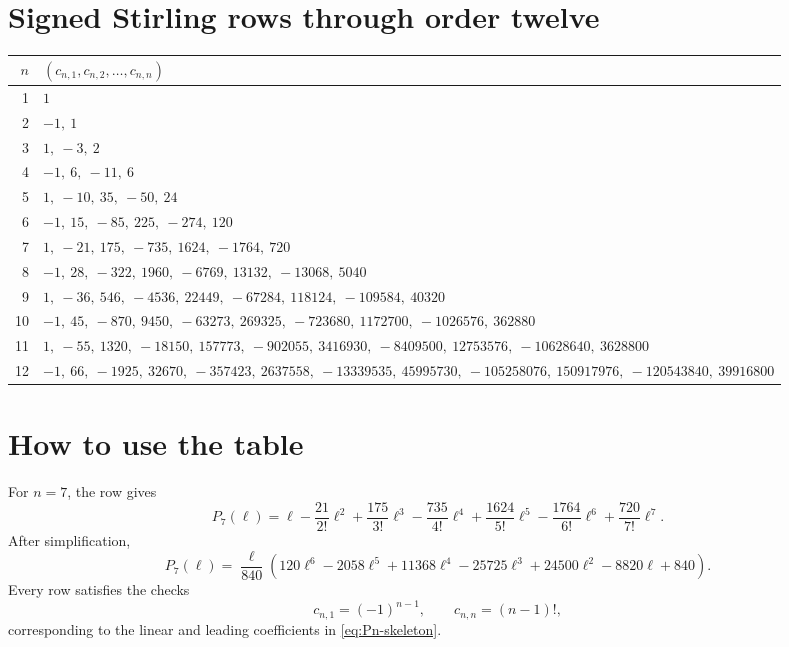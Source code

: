 \documentclass[11pt,openany]{book}
\theoremstyle{definition}
\theoremstyle{plain}
\theoremstyle{remark}
\begin{document}
\section{Signed Stirling rows through order twelve}
{\footnotesize
\begin{longtable}{@{}r>{\raggedright\arraybackslash}p{}@{}}
\toprule
\(n\) & \((c_{n,1},c_{n,2},\ldots,c_{n,n})\)\\
\midrule
\endhead
1 & \(1\)\\
2 & \(-1,\allowbreak\ 1\)\\
3 & \(1,\allowbreak\ -3,\allowbreak\ 2\)\\
4 & \(-1,\allowbreak\ 6,\allowbreak\ -11,\allowbreak\ 6\)\\
5 & \(1,\allowbreak\ -10,\allowbreak\ 35,\allowbreak\ -50,\allowbreak\ 24\)\\
6 & \(-1,\allowbreak\ 15,\allowbreak\ -85,\allowbreak\ 225,\allowbreak\ -274,\allowbreak\ 120\)\\
7 & \(1,\allowbreak\ -21,\allowbreak\ 175,\allowbreak\ -735,\allowbreak\ 1624,\allowbreak\ -1764,\allowbreak\ 720\)\\
8 & \(-1,\allowbreak\ 28,\allowbreak\ -322,\allowbreak\ 1960,\allowbreak\ -6769,\allowbreak\ 13132,\allowbreak\ -13068,\allowbreak\ 5040\)\\
9 & \(1,\allowbreak\ -36,\allowbreak\ 546,\allowbreak\ -4536,\allowbreak\ 22449,\allowbreak\ -67284,\allowbreak\ 118124,\allowbreak\ -109584,\allowbreak\ 40320\)\\
10 & \(-1,\allowbreak\ 45,\allowbreak\ -870,\allowbreak\ 9450,\allowbreak\ -63273,\allowbreak\ 269325,\allowbreak\ -723680,\allowbreak\ 1172700,\allowbreak\ -1026576,\allowbreak\ 362880\)\\
11 & \(1,\allowbreak\ -55,\allowbreak\ 1320,\allowbreak\ -18150,\allowbreak\ 157773,\allowbreak\ -902055,\allowbreak\ 3416930,\allowbreak\ -8409500,\allowbreak\ 12753576,\allowbreak\ -10628640,\allowbreak\ 3628800\)\\
12 & \(-1,\allowbreak\ 66,\allowbreak\ -1925,\allowbreak\ 32670,\allowbreak\ -357423,\allowbreak\ 2637558,\allowbreak\ -13339535,\allowbreak\ 45995730,\allowbreak\ -105258076,\allowbreak\ 150917976,\allowbreak\ -120543840,\allowbreak\ 39916800\)\\
\bottomrule
\end{longtable}
}
\section{How to use the table}
For \(n=7\), the row gives
\[
 P_7(\ell)
 =\ell-\frac{21}{2!}\ell^2+\frac{175}{3!}\ell^3
 -\frac{735}{4!}\ell^4+\frac{1624}{5!}\ell^5
 -\frac{1764}{6!}\ell^6+\frac{720}{7!}\ell^7.
\]
After simplification,
\[
 P_7(\ell)
 =\frac{\ell}{840}
 \left(120\ell^6-2058\ell^5+11368\ell^4-25725\ell^3
 +24500\ell^2-8820\ell+840\right).
\]
Every row satisfies the checks
\[
 c_{n,1}=(-1)^{n-1},
 \qquad
 c_{n,n}=(n-1)!,
\]
corresponding to the linear and leading coefficients in \cref{eq:Pn-skeleton}.
\end{document}
